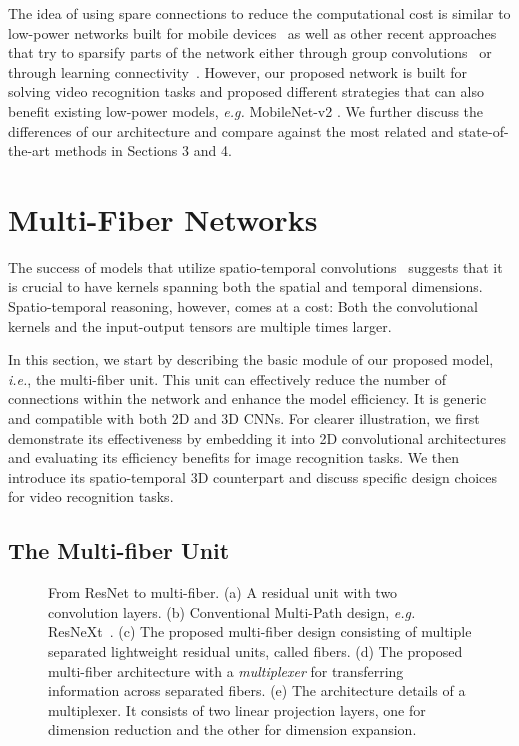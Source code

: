 \documentclass[runningheads]{llncs}
\newcommand{\ourslong}[0]{multi-fiber\xspace}
\newcommand{\ourslongcaps}[0]{Multi-Fiber\xspace}
\newcommand{\ourslongcap}[0]{Multi-fiber\xspace}
\newcommand{\switch}[0]{multiplexer\xspace}
\begin{document}
The idea of using spare connections to reduce the computational cost is similar to low-power networks built for mobile devices~\cite{howard2017mobilenets,sandler2018inverted,zhang2017shufflenet} as well as other recent approaches that try to sparsify parts of the network either through group convolutions~\cite{xie2017aggregated} or through learning connectivity~\cite{ahmed2018maskconnect}. However, our proposed network is built for solving video recognition tasks and proposed different strategies that can also benefit existing low-power models, \emph{e.g.} MobileNet-v2 \cite{sandler2018inverted}. We further discuss the differences of our architecture and compare against the most related and state-of-the-art methods in Sections 3 and 4.

 
\section{\ourslongcaps Networks}
\label{sec:method}

The success of models that utilize spatio-temporal convolutions~\cite{tran2015learning,carreira2017quo,tran2017closer,xie2017rethinking,hara2018can} suggests that it is crucial to have kernels spanning both the spatial and temporal dimensions. Spatio-temporal reasoning, however, comes at a cost: Both the convolutional kernels and the input-output tensors are multiple times larger. 


In this section, we start by describing the basic module of our proposed model, \emph{i.e.}, the \ourslong unit. This unit can effectively reduce the number of connections within the network and enhance the model efficiency. It is generic and compatible with both 2D and 3D CNNs. For clearer illustration, we first demonstrate its effectiveness by embedding it into 2D convolutional architectures and evaluating its efficiency benefits for image recognition tasks. We then introduce its spatio-temporal 3D counterpart and discuss specific design choices for video recognition tasks.

\subsection{The \ourslongcap Unit}


\begin{figure}[t]	
	\center
	\caption{From ResNet to \ourslong.
    (a) A residual unit with two  convolution layers. (b) Conventional Multi-Path design, \emph{e.g.} ResNeXt~\cite{xie2017aggregated}. (c) The proposed \ourslong design consisting of multiple separated lightweight residual units, called fibers. (d) The proposed \ourslong architecture with a \textit{\switch} for transferring information across separated fibers. (e) The architecture details of a \switch. It consists of two linear projection layers, one for dimension reduction and the other for dimension expansion.}
	\label{fig_multibranch_unit}
\end{figure}
\end{document}
